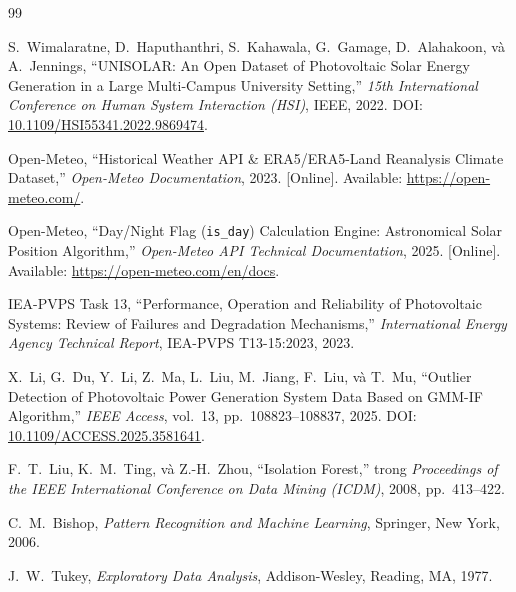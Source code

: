 \documentclass[12pt, a4paper]{report}
\begin{document}
\newpage

\begin{thebibliography}{99}

S.~Wimalaratne, D.~Haputhanthri, S.~Kahawala, G.~Gamage, D.~Alahakoon, và A.~Jennings,
\newblock ``UNISOLAR: An Open Dataset of Photovoltaic Solar Energy Generation in a Large Multi-Campus University Setting,''
\newblock \textit{15th International Conference on Human System Interaction (HSI)}, IEEE, 2022.
\newblock DOI: \href{https://doi.org/10.1109/HSI55341.2022.9869474}{10.1109/HSI55341.2022.9869474}.

Open-Meteo,
\newblock ``Historical Weather API \& ERA5/ERA5-Land Reanalysis Climate Dataset,''
\newblock \textit{Open-Meteo Documentation}, 2023. [Online]. Available: \url{https://open-meteo.com/}.

Open-Meteo,
\newblock ``Day/Night Flag (\texttt{is\_day}) Calculation Engine: Astronomical Solar Position Algorithm,''
\newblock \textit{Open-Meteo API Technical Documentation}, 2025. [Online]. Available: \url{https://open-meteo.com/en/docs}.

IEA-PVPS Task 13,
\newblock ``Performance, Operation and Reliability of Photovoltaic Systems: Review of Failures and Degradation Mechanisms,''
\newblock \textit{International Energy Agency Technical Report}, IEA-PVPS T13-15:2023, 2023.

X.~Li, G.~Du, Y.~Li, Z.~Ma, L.~Liu, M.~Jiang, F.~Liu, và T.~Mu,
\newblock ``Outlier Detection of Photovoltaic Power Generation System Data Based on GMM-IF Algorithm,''
\newblock \textit{IEEE Access}, vol.~13, pp.~108823--108837, 2025.
\newblock DOI: \href{https://doi.org/10.1109/ACCESS.2025.3581641}{10.1109/ACCESS.2025.3581641}.

F.~T.~Liu, K.~M.~Ting, và Z.-H.~Zhou,
\newblock ``Isolation Forest,''
\newblock trong \textit{Proceedings of the IEEE International Conference on Data Mining (ICDM)}, 2008, pp.~413--422.

C.~M.~Bishop,
\newblock \textit{Pattern Recognition and Machine Learning},
\newblock Springer, New York, 2006.

J.~W.~Tukey,
\newblock \textit{Exploratory Data Analysis},
\newblock Addison-Wesley, Reading, MA, 1977.


\end{thebibliography}
\end{document}
